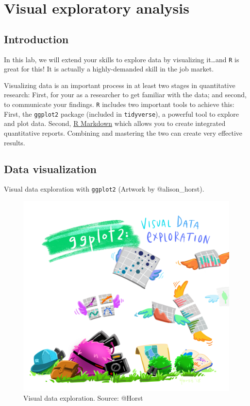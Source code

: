 \documentclass[
]{book}
\begin{document}
\hypertarget{visual-exploratory-analysis}{%
\chapter{Visual exploratory analysis}\label{visual-exploratory-analysis}}

\hypertarget{introduction-1}{%
\section{Introduction}\label{introduction-1}}

In this lab, we will extend your skills to explore data by visualizing it\ldots and \texttt{R} is great for this! It is actually a highly-demanded skill in the job market.

Visualizing data is an important process in at least two stages in quantitative research: First, for your as a researcher to get familiar with the data; and second, to communicate your findings. \texttt{R} includes two important tools to achieve this: First, the \texttt{ggplot2} package (included in \texttt{tidyverse}), a powerful tool to explore and plot data. Second, \href{https://rmarkdown.rstudio.com/}{R Markdown} which allows you to create integrated quantitative reports. Combining and mastering the two can create very effective results.

\hypertarget{data-visualization}{%
\section{Data visualization}\label{data-visualization}}

Visual data exploration with \texttt{ggplot2} (Artwork by @alison\_horst).

\begin{figure}

\includegraphics[width=1\linewidth]{./images/lab4_ggplot2_exploratory} \hfill{}

\caption{Visual data exploration. Source: @Horst}\label{fig:unnamed-chunk-61}
\end{figure}
\end{document}
